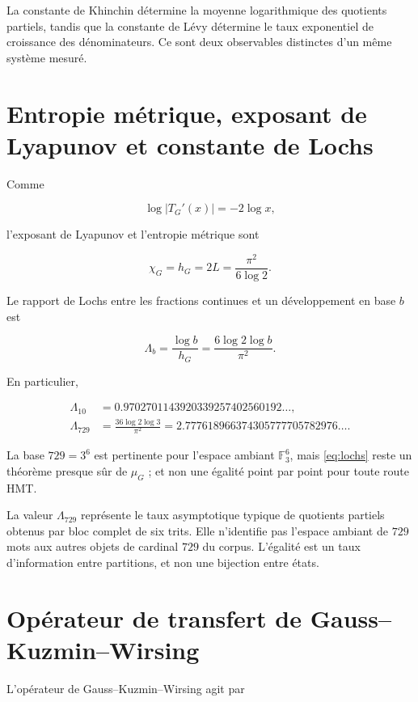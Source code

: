 La constante de Khinchin détermine la moyenne logarithmique des quotients
partiels, tandis que la constante de Lévy détermine le taux exponentiel
de croissance des dénominateurs. Ce sont deux observables distinctes d'un
même système mesuré.

\section{Entropie métrique, exposant de Lyapunov et constante de Lochs}

Comme

\[
\log|T_G'(x)|=-2\log x,
\]

l'exposant de Lyapunov et l'entropie métrique sont

\begin{equation}
\chi_G=h_G=2L=\frac{\pi^2}{6\log2}.
\label{eq:gauss-entropy}
\end{equation}

Le rapport de Lochs entre les fractions continues et un développement en base \(b\) est

\begin{equation}
\Lambda_b=\frac{\log b}{h_G}
=\frac{6\log2\log b}{\pi^2}.
\label{eq:lochs}
\end{equation}

En particulier,

\begin{align*}
\Lambda_{10}&=0.9702701143920339257402560192\ldots,\\
\Lambda_{729}&=\frac{36\log2\log3}{\pi^2}
=2.777618966374305777705782976\ldots.
\end{align*}

La base \(729=3^6\) est pertinente pour l'espace ambiant \(\mathbb F_3^6\), mais \cref{eq:lochs} reste un théorème presque sûr de \(\mu_G\) ; et non une égalité point par point pour toute route HMT.

La valeur \(\Lambda_{729}\) représente le taux asymptotique typique de
quotients partiels obtenus par bloc complet de six trits. Elle n'identifie pas
l'espace ambiant de \(729\) mots aux autres objets de cardinal \(729\) du
corpus. L'égalité est un taux d'information entre partitions, et non une
bijection entre états.

\section{Opérateur de transfert de Gauss--Kuzmin--Wirsing}

L'opérateur de Gauss--Kuzmin--Wirsing agit par

